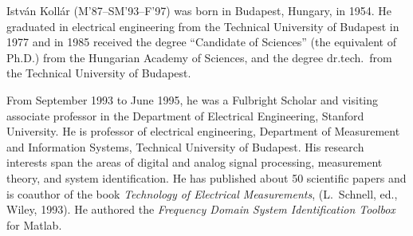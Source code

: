 \documentclass[%
	final,
	notitlepage,
	narroweqnarray,
	inline,
	twoside,
	]{ieee}
\begin{document}
\begin{biography}{Istv\'{a}n Koll\'{a}r} 
(M'87--SM'93--F'97) was born in Budapest, Hungary, in 1954. He graduated 
in electrical engineering from the Technical University of Budapest in 
1977 and in 1985 received the degree ``Candidate of Sciences'' (the 
equivalent of Ph.D.) from the Hungarian Academy of Sciences, and the 
degree dr.tech.\ from the Technical University of Budapest.

From September 1993 to June 1995, he was a Fulbright Scholar and
visiting associate professor in the Department of Electrical
Engineering, Stanford University. He is professor of electrical
engineering, Department of Measurement and Information Systems,
Technical University of Budapest. His research interests span the
areas of digital and analog signal processing, measurement theory, and
system identification. He has published about 50 scientific papers and
is coauthor of the book \emph{Technology of Electrical Measurements},
(L.\ Schnell, ed., Wiley, 1993). He authored the \emph{Frequency
Domain System Identification Toolbox} for Matlab.
\end{biography}
\end{document}
